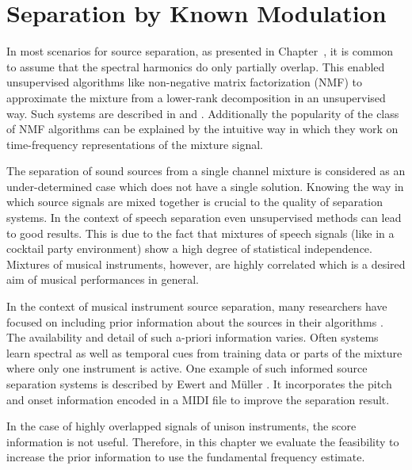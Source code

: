 \chapter{Separation by Known Modulation}


In most scenarios for source separation, as presented in Chapter~\cite{objectives-and-challenges}, it is common to assume that the spectral harmonics do only partially overlap.
This enabled unsupervised algorithms like non-negative matrix factorization (NMF) to approximate the mixture from a lower-rank decomposition in an unsupervised way.
Such systems are described in \cite{smaragdis03} and \cite{virtanen07}.
Additionally the popularity of the class of NMF algorithms can be explained by the intuitive way in which they work on time-frequency representations of the mixture signal.

The separation of sound sources from a single channel mixture is considered as an under-determined case which does not have a single solution. Knowing the way in which source signals are mixed together is crucial to the quality of separation systems. In the context of speech separation even unsupervised methods can lead to good results. This is due to the fact that mixtures of speech signals (like in a cocktail party environment) show a high degree of statistical independence. Mixtures of musical instruments, however, are highly correlated which is a desired aim of musical performances in general.

In the context of musical instrument source separation, many researchers have focused on including prior information about the sources in their algorithms \cite{ozerov12}.
The availability and detail of such a-priori information varies. Often systems learn spectral as well as temporal cues from training data or parts of the mixture where only one instrument is active.
One example of such informed source separation systems is described by Ewert and M\"uller \cite{ewert12}.
It incorporates the pitch and onset information encoded in a MIDI file to improve the separation result.

In the case of highly overlapped signals of unison instruments, the score information is not useful.
Therefore, in this chapter we evaluate the feasibility to increase the prior information to use the fundamental frequency estimate.

